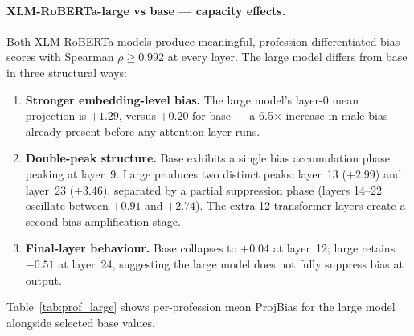 \documentclass[11pt,a4paper]{article}
\begin{document}
\paragraph{XLM-RoBERTa-large vs base — capacity effects.}
Both XLM-RoBERTa models produce meaningful, profession-differentiated bias
scores with Spearman $\rho \geq 0.992$ at every layer. The large model differs
from base in three structural ways:
\begin{enumerate}
  \item \textbf{Stronger embedding-level bias.} The large model's layer-0 mean
    projection is $+1.29$, versus $+0.20$ for base — a 6.5$\times$ increase in
    male bias already present before any attention layer runs.
  \item \textbf{Double-peak structure.} Base exhibits a single bias accumulation
    phase peaking at layer~9. Large produces two distinct peaks: layer~13
    ($+2.99$) and layer~23 ($+3.46$), separated by a partial suppression phase
    (layers 14--22 oscillate between $+0.91$ and $+2.74$). The extra 12
    transformer layers create a second bias amplification stage.
  \item \textbf{Final-layer behaviour.} Base collapses to $+0.04$ at layer~12;
    large retains $-0.51$ at layer~24, suggesting the large model does not
    fully suppress bias at output.
\end{enumerate}

Table~\ref{tab:prof_large} shows per-profession mean ProjBias for the large model
alongside selected base values.
\end{document}
